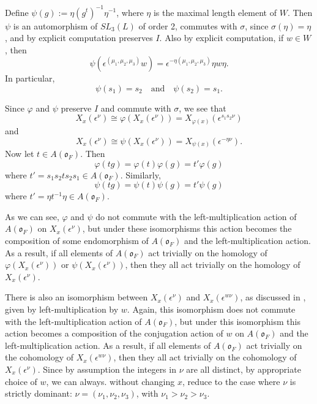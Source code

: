 \documentclass{amsart}
\theoremstyle{definition}
\def\O{\mathfrak{o}}
\def\e{\epsilon}
\def\s{\sigma}
\def\A{A(\O_F)}
\def\en{\e^{\nu}}
\def\X{X_x(\en)}
\def\phi{\varphi}
\begin{document}
  Define $\psi(g) := \eta(g^t)^{-1} \eta^{-1}$, where $\eta$ is the maximal
  length element of $W$.  Then $\psi$ is an automorphism of $SL_3(L)$ of order
  2, commutes with $\s$, since $\s(\eta) = \eta$, and by explicit computation
  preserves $I$.  Also by explicit computation, if $w \in W$, then
  \begin{equation*}
    \psi(\e^{(\mu_1,\mu_2,\mu_3)}w) = \e^{-\eta(\mu_1, \mu_2, \mu_3)}\eta w \eta.
  \end{equation*}
  In particular,
  \begin{equation*}
    \psi(s_1) = s_2 \quad \mbox{and} \quad \psi(s_2) = s_1.
  \end{equation*}

  Since $\phi$
  and $\psi$ preserve $I$ and commute with $\s$, we see that
  \begin{equation*}
    \X \cong \phi(\X) = X_{\phi(x)}(\e^{s_1s_2\nu})
  \end{equation*}
  and
  \begin{equation*}
    \X \cong \psi(\X) = X_{\psi(x)}(\e^{-\eta\nu}).
  \end{equation*}
  Now let $t \in \A$.  Then
  \begin{equation*}
    \phi(tg) = \phi(t)\phi(g) = t'\phi(g)
  \end{equation*}
  where $t' = s_1s_2ts_2s_1 \in \A$.  Similarly,
  \begin{equation*}
    \psi(tg) = \psi(t)\psi(g) = t'\psi(g)
  \end{equation*}
  where $t' = \eta t^{-1} \eta \in \A$.

  As we can see, $\phi$ and $\psi$ do not commute with the left-multiplication
  action of $\A$ on $\X$, but under these isomorphisms this action becomes the
  composition of some endomorphism of $\A$ and the left-multiplication action.
  As a result, if all elements of $\A$ act trivially on the homology of
  $\phi(\X)$ or $\psi(\X)$, then they all act trivially on the homology of
  $\X$.

  There is also an isomorphism between $\X$ and $X_x(\e^{w\nu})$, as discussed
  in \cite{Kottwitz-f_nu}, given by left-multiplication by $w$.  Again, this
  isomorphism does not commute with the left-multiplication action of $\A$, but
  under this isomorphism this action becomes a composition of the conjugation
  action of $w$ on $\A$ and the left-multiplication action.  As a result, if
  all elements of $\A$ act trivially on the cohomology of $X_x(\e^{w\nu})$,
  then they all act trivially on the cohomology of $\X$.  Since by assumption
  the integers in $\nu$ are all distinct, by appropriate choice of $w$, we can
  always. without changing $x$, reduce to the case where $\nu$ is strictly
  dominant: $\nu = (\nu_1, \nu_2, \nu_3)$, with $\nu_1 > \nu_2 > \nu_3$.
\end{document}
